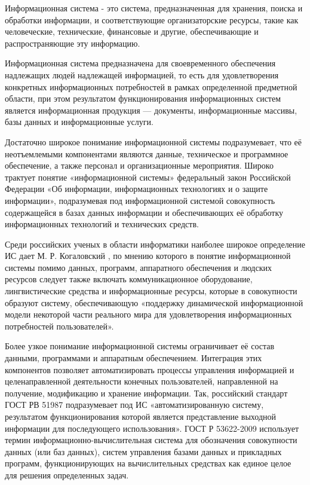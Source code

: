 Информационная система - это система, предназначенная для хранения, поиска и обработки информации, и соответствующие организаторские ресурсы, такие как человеческие, технические, финансовые и другие, обеспечивающие и распространяющие эту информацию.

Информационная система предназначена для своевременного обеспечения надлежащих людей надлежащей информацией, то есть для удовлетворения конкретных информационных потребностей в рамках определенной предметной области, при этом результатом функционирования информационных систем является информационная продукция — документы, информационные массивы, базы данных и информационные услуги.

Достаточно широкое понимание информационной системы подразумевает, что её неотъемлемыми компонентами являются данные, техническое и программное обеспечение, а также персонал и организационные мероприятия. Широко трактует понятие «информационной системы» федеральный закон Российской Федерации «Об информации, информационных технологиях и о защите информации», подразумевая под информационной системой совокупность содержащейся в базах данных информации и обеспечивающих её обработку информационных технологий и технических средств.

Среди российских ученых в области информатики наиболее широкое определение ИС дает М. Р. Когаловский \cite{Kogalovskij2013}, по мнению которого в понятие информационной системы помимо данных, программ, аппаратного обеспечения и людских ресурсов следует также включать коммуникационное оборудование, лингвистические средства и информационные ресурсы, которые в совокупности образуют систему, обеспечивающую «поддержку динамической информационной модели некоторой части реального мира для удовлетворения информационных потребностей пользователей».

Более узкое понимание информационной системы ограничивает её состав данными, программами и аппаратным обеспечением. Интеграция этих компонентов позволяет автоматизировать процессы управления информацией и целенаправленной деятельности конечных пользователей, направленной на получение, модификацию и хранение информации. Так, российский стандарт ГОСТ РВ 51987 подразумевает под ИС «автоматизированную систему, результатом функционирования которой является представление выходной информации для последующего использования». ГОСТ Р 53622-2009 использует термин информационно-вычислительная система для обозначения совокупности данных (или баз данных), систем управления базами данных и прикладных программ, функционирующих на вычислительных средствах как единое целое для решения определенных задач.

